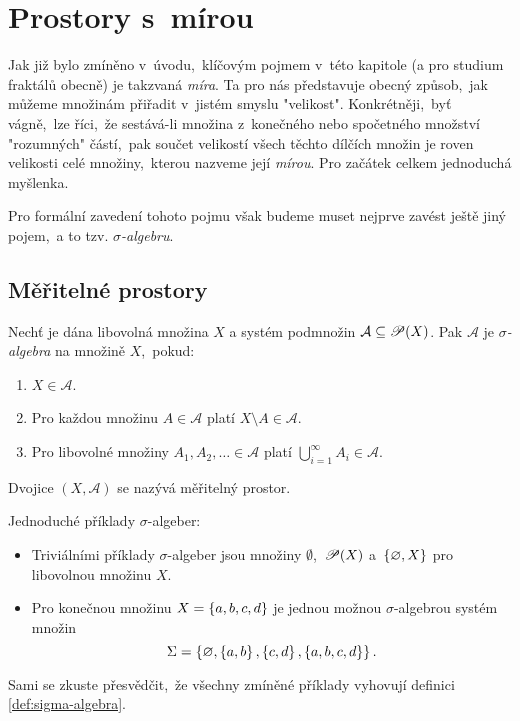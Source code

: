 \section{Prostory s~mírou}\label{sec:prostory-s-mirou}

Jak již bylo zmíněno v~úvodu,~klíčovým pojmem v~této kapitole (a pro studium fraktálů obecně) je takzvaná \emph{míra}. Ta pro nás představuje obecný způsob,~jak můžeme množinám přiřadit v~jistém smyslu "velikost". Konkrétněji,~byť vágně,~lze říci,~že sestává-li množina z~konečného nebo spočetného množství "rozumných" částí,~pak součet velikostí všech těchto dílčích množin je roven velikosti celé množiny,~kterou nazveme její \emph{mírou}. Pro začátek celkem jednoduchá myšlenka.

Pro formální zavedení tohoto pojmu však budeme muset nejprve zavést ještě jiný pojem,~a to tzv. \emph{$\sigma$-algebru}.

\subsection{Měřitelné prostory}\label{subsec:meritelne-prostory}

\begin{definition}\label{def:sigma-algebra}
    Nechť je dána libovolná množina $X$ a systém podmnožin $\mathcal{A}\subseteq\mathscr{P}(X)$. Pak $\mathcal{A}$ je \emph{$\sigma$-algebra} na množině $X$,~pokud:
    \begin{enumerate}[label=(\alph*)]
        \item\label{def:sigma-algebra-podm1} $X\in\mathcal{A}$.
        \item\label{def:sigma-algebra-podm2} Pro každou množinu $A\in\mathcal{A}$ platí $X\setminus A\in\mathcal{A}$.
        \item\label{def:sigma-algebra-podm3} Pro libovolné množiny $A_1,A_2,\ldots\in\mathcal{A}$ platí $\bigcup_{i=1}^\infty A_i\in\mathcal{A}$.
    \end{enumerate}
    Dvojice $(X,\mathcal{A})$ se nazývá měřitelný prostor.
\end{definition}

\begin{example}
    Jednoduché příklady $\sigma$-algeber:
    \begin{itemize}
        \item Triviálními příklady $\sigma$-algeber jsou množiny $\emptyset$,~$\mathscr{P}(X)$ a~$\left\{\varnothing,X\right\}$ pro libovolnou množinu $X$.
        \item Pro konečnou množinu $X=\left\{a,b,c,d\right\}$ je jednou možnou $\sigma$-algebrou systém množin
        \[\Sigma=\left\{\varnothing,\left\{a,b\right\},\left\{c,d\right\},\left\{a,b,c,d\right\}\right\}.\]
    \end{itemize}
    Sami se zkuste přesvědčit,~že všechny zmíněné příklady vyhovují definici \ref{def:sigma-algebra}.
\end{example}

